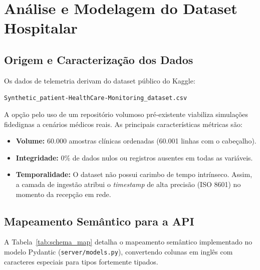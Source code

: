 \documentclass[12pt,a4paper]{article}
\begin{document}
	\section{Análise e Modelagem do Dataset Hospitalar}
	
	\subsection{Origem e Caracterização dos Dados}
	Os dados de telemetria derivam do dataset público do Kaggle:
	\begin{center}
		\texttt{Synthetic\_patient-HealthCare-Monitoring\_dataset.csv}
	\end{center}
	A opção pelo uso de um repositório volumoso pré-existente viabiliza simulações fidedignas a cenários médicos reais. As principais características métricas são:
	\begin{itemize}
		\item \textbf{Volume:} 60.000 amostras clínicas ordenadas (60.001 linhas com o cabeçalho).
		\item \textbf{Integridade:} 0\% de dados nulos ou registros ausentes em todas as variáveis.
		\item \textbf{Temporalidade:} O dataset não possui carimbo de tempo intrínseco. Assim, a camada de ingestão atribui o \textit{timestamp} de alta precisão (ISO 8601) no momento da recepção em rede.
	\end{itemize}
	
	\subsection{Mapeamento Semântico para a API}
	A Tabela~\ref{tab:schema_map} detalha o mapeamento semântico implementado no modelo Pydantic (\texttt{server/models.py}), convertendo colunas em inglês com caracteres especiais para tipos fortemente tipados.
	
\end{document}
